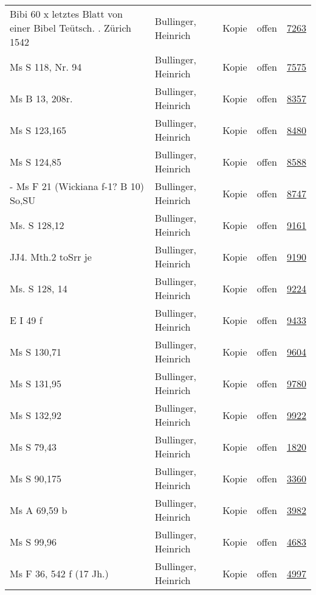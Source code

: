\documentclass[10pt,a4paper,landscape]{report}
\begin{document}
\begin{longtable}{p{16cm}p{4cm}llr}
Bibi 60 x letztes Blatt von einer Bibel Teütsch. . Zürich 1542	&	Bullinger, Heinrich	&	Kopie	&	offen	&	\href{http://130.60.24.72/assignment/7263}{7263}\\
Ms S 118, Nr. 94	&	Bullinger, Heinrich	&	Kopie	&	offen	&	\href{http://130.60.24.72/assignment/7575}{7575}\\
Ms B 13, 208r.	&	Bullinger, Heinrich	&	Kopie	&	offen	&	\href{http://130.60.24.72/assignment/8357}{8357}\\
Ms S 123,165	&	Bullinger, Heinrich	&	Kopie	&	offen	&	\href{http://130.60.24.72/assignment/8480}{8480}\\
Ms S 124,85	&	Bullinger, Heinrich	&	Kopie	&	offen	&	\href{http://130.60.24.72/assignment/8588}{8588}\\
- Ms F 21 (Wickiana f-1? B 10) So,SU	&	Bullinger, Heinrich	&	Kopie	&	offen	&	\href{http://130.60.24.72/assignment/8747}{8747}\\
Ms. S 128,12	&	Bullinger, Heinrich	&	Kopie	&	offen	&	\href{http://130.60.24.72/assignment/9161}{9161}\\
JJ4. Mth.2 toSrr je	&	Bullinger, Heinrich	&	Kopie	&	offen	&	\href{http://130.60.24.72/assignment/9190}{9190}\\
Ms. S 128, 14	&	Bullinger, Heinrich	&	Kopie	&	offen	&	\href{http://130.60.24.72/assignment/9224}{9224}\\
E I 49 f	&	Bullinger, Heinrich	&	Kopie	&	offen	&	\href{http://130.60.24.72/assignment/9433}{9433}\\
Ms S 130,71	&	Bullinger, Heinrich	&	Kopie	&	offen	&	\href{http://130.60.24.72/assignment/9604}{9604}\\
Ms S 131,95	&	Bullinger, Heinrich	&	Kopie	&	offen	&	\href{http://130.60.24.72/assignment/9780}{9780}\\
Ms S 132,92	&	Bullinger, Heinrich	&	Kopie	&	offen	&	\href{http://130.60.24.72/assignment/9922}{9922}\\
Ms S 79,43	&	Bullinger, Heinrich	&	Kopie	&	offen	&	\href{http://130.60.24.72/assignment/1820}{1820}\\
Ms S 90,175	&	Bullinger, Heinrich	&	Kopie	&	offen	&	\href{http://130.60.24.72/assignment/3360}{3360}\\
Ms A  69,59 b	&	Bullinger, Heinrich	&	Kopie	&	offen	&	\href{http://130.60.24.72/assignment/3982}{3982}\\
Ms S 99,96	&	Bullinger, Heinrich	&	Kopie	&	offen	&	\href{http://130.60.24.72/assignment/4683}{4683}\\
Ms F 36, 542 f (17 Jh.)	&	Bullinger, Heinrich	&	Kopie	&	offen	&	\href{http://130.60.24.72/assignment/4997}{4997}\\

\end{longtable}
\end{document}
